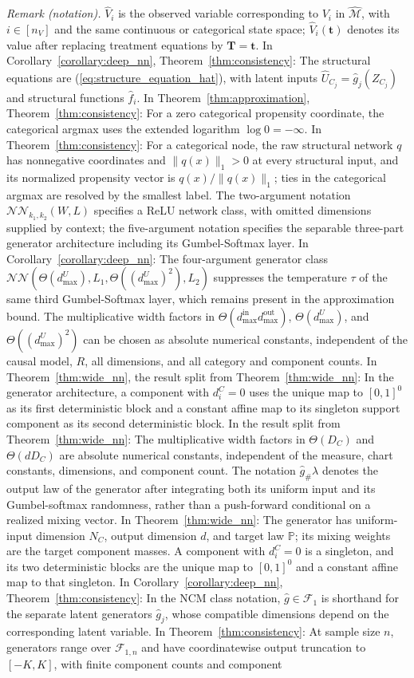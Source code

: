 \documentclass[12pt]{article}
\theoremstyle{plain}
\theoremstyle{definition}
\theoremstyle{remark}
\begin{document}
\noindent\textit{Remark (notation).} $\hat{V}_i$ is the observed variable corresponding to $V_i$ in $\hat{\mathcal{M}}$, with $i\in[n_V]$ and the same continuous or categorical state space; $\hat{V}_i(\boldsymbol{t})$ denotes its value after replacing treatment equations by $\boldsymbol{T}=\boldsymbol{t}$. In Corollary~\ref{corollary:deep_nn}, Theorem~\ref{thm:consistency}: The structural equations are (\ref{eq:structure_equation_hat}), with latent inputs $\hat{U}_{C_j}=\hat{g}_j(Z_{C_j})$ and structural functions $\hat{f}_i$. In Theorem~\ref{thm:approximation}, Theorem~\ref{thm:consistency}: For a zero categorical propensity coordinate, the categorical argmax uses the extended logarithm $\log0=-\infty$. In Theorem~\ref{thm:consistency}: For a categorical node, the raw structural network $q$ has nonnegative coordinates and $\|q(x)\|_1>0$ at every structural input, and its normalized propensity vector is $q(x)/\|q(x)\|_1$; ties in the categorical argmax are resolved by the smallest label. The two-argument notation $\mathcal{NN}_{k_1,k_2}(W,L)$ specifies a ReLU network class, with omitted dimensions supplied by context; the five-argument notation specifies the separable three-part generator architecture including its Gumbel-Softmax layer. In Corollary~\ref{corollary:deep_nn}: The four-argument generator class $\mathcal{NN}(\Theta(d_{\max}^U),L_1,\Theta((d_{\max}^U)^2),L_2)$ suppresses the temperature $\tau$ of the same third Gumbel-Softmax layer, which remains present in the approximation bound. The multiplicative width factors in $\Theta(d_{\max}^{\text{in}}d_{\max}^{\text{out}})$, $\Theta(d_{\max}^U)$, and $\Theta((d_{\max}^U)^2)$ can be chosen as absolute numerical constants, independent of the causal model, $R$, all dimensions, and all category and component counts. In Theorem~\ref{thm:wide_nn}, the result split from Theorem~\ref{thm:wide_nn}: In the generator architecture, a component with $d_i^C=0$ uses the unique map to $[0,1]^0$ as its first deterministic block and a constant affine map to its singleton support component as its second deterministic block. In the result split from Theorem~\ref{thm:wide_nn}: The multiplicative width factors in $\Theta(D_C)$ and $\Theta(dD_C)$ are absolute numerical constants, independent of the measure, chart constants, dimensions, and component count. The notation $\hat{g}_{\#}\lambda$ denotes the output law of the generator after integrating both its uniform input and its Gumbel-softmax randomness, rather than a push-forward conditional on a realized mixing vector. In Theorem~\ref{thm:wide_nn}: The generator has uniform-input dimension $N_C$, output dimension $d$, and target law $\mathbb{P}$; its mixing weights are the target component masses. A component with $d_i^C=0$ is a singleton, and its two deterministic blocks are the unique map to $[0,1]^0$ and a constant affine map to that singleton. In Corollary~\ref{corollary:deep_nn}, Theorem~\ref{thm:consistency}: In the NCM class notation, $\hat{g}\in\mathcal{F}_1$ is shorthand for the separate latent generators $\hat{g}_j$, whose compatible dimensions depend on the corresponding latent variable. In Theorem~\ref{thm:consistency}: At sample size $n$, generators range over $\mathcal{F}_{1,n}$ and have coordinatewise output truncation to $[-K,K]$, with finite component counts and component 
\end{document}
